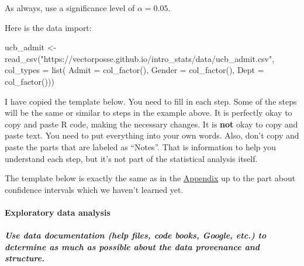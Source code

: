 \documentclass[
]{book}
\newenvironment{Shaded}{\begin{snugshade}}{\end{snugshade}}
\newcommand{\AttributeTok}[1]{\textcolor[rgb]{0.77,0.63,0.00}{#1}}
\newcommand{\FunctionTok}[1]{\textcolor[rgb]{0.00,0.00,0.00}{#1}}
\newcommand{\NormalTok}[1]{#1}
\newcommand{\OtherTok}[1]{\textcolor[rgb]{0.56,0.35,0.01}{#1}}
\newcommand{\StringTok}[1]{\textcolor[rgb]{0.31,0.60,0.02}{#1}}
\begin{document}
As always, use a significance level of \(\alpha = 0.05\).

Here is the data import:

\begin{Shaded}
\begin{Highlighting}[]
\NormalTok{ucb\_admit }\OtherTok{\textless{}{-}} \FunctionTok{read\_csv}\NormalTok{(}\StringTok{"https://vectorposse.github.io/intro\_stats/data/ucb\_admit.csv"}\NormalTok{,}
                      \AttributeTok{col\_types =} \FunctionTok{list}\NormalTok{(}
                          \AttributeTok{Admit =} \FunctionTok{col\_factor}\NormalTok{(),}
                          \AttributeTok{Gender =} \FunctionTok{col\_factor}\NormalTok{(),}
                          \AttributeTok{Dept =} \FunctionTok{col\_factor}\NormalTok{()))}
\end{Highlighting}
\end{Shaded}

I have copied the template below. You need to fill in each step. Some of the steps will be the same or similar to steps in the example above. It is perfectly okay to copy and paste R code, making the necessary changes. It is \textbf{not} okay to copy and paste text. You need to put everything into your own words. Also, don't copy and paste the parts that are labeled as ``Notes''. That is information to help you understand each step, but it's not part of the statistical analysis itself.

The template below is exactly the same as in the \protect\hyperlink{appendix-rubric}{Appendix} up to the part about confidence intervals which we haven't learned yet.

\hypertarget{exploratory-data-analysis}{%
\paragraph*{Exploratory data analysis}\label{exploratory-data-analysis}}

\hypertarget{use-data-documentation-help-files-code-books-google-etc.-to-determine-as-much-as-possible-about-the-data-provenance-and-structure.}{%
\subparagraph*{Use data documentation (help files, code books, Google, etc.) to determine as much as possible about the data provenance and structure.}\label{use-data-documentation-help-files-code-books-google-etc.-to-determine-as-much-as-possible-about-the-data-provenance-and-structure.}}
\end{document}
